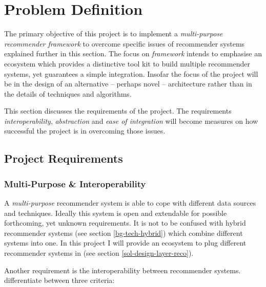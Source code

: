 \chapter{Problem Definition}
\label{problem}

The primary objective of this project is to implement a \textit{multi-purpose recommender framework} to overcome specific issues of recommender systems explained further in this section. The focus on \emph{framework} intends to emphasise an ecosystem which provides a distinctive tool kit to build multiple recommender systems, yet guarantees a simple integration. Insofar the focus of the project will be in the design of an alternative -- perhaps novel -- architecture rather than in the details of techniques and algorithms.

This section discusses the requirements of the project. The requirements \emph{interoperability}, \emph{abstraction} and \emph{ease of integration} will become measures on how successful the project is in overcoming those issues.



\section{Project Requirements}

\subsection{Multi-Purpose \& Interoperability}
\label{problem-multipurpose}

A \emph{multi-purpose} recommender system is able to cope with different data sources and techniques. Ideally this system is open and extendable for possible forthcoming, yet unknown requirements. It is not to be confused with hybrid recommender systems (see section \ref{bg-tech-hybrid}) which combine different systems into one. In this project I will provide an ecosystem to plug different recommender systems in (see section \ref{sol-design-layer-reco}).

Another requirement is the interoperability between recommender systems. \citet{manouselis07} differentiate between three criteria:

